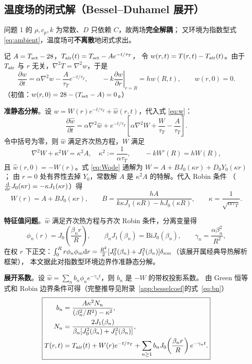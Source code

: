 \documentclass[withoutpreface,bwprint]{cumcmthesis}
\begin{document}
\subsection{温度场的闭式解（Bessel--Duhamel 展开）}
\label{sec:bessel}

问题 1 的 $\rho,c_p,k$ 为常数、$D$ 只依赖 $C$，故两场\textbf{完全解耦}；
又环境为指数型式 \eqref{eq:ambient}，温度场可\textbf{不离散}地闭式求出。

记 $A=T_{\rm set}-28$，$T_{\rm air}(t)=T_{\rm set}-Ae^{-t/\tau_T}$，
令 $w(r,t)=T(r,t)-T_{\rm air}(t)$。由于 $T_{\rm air}$ 与 $r$ 无关，$\nabla^2T=\nabla^2w$，于是
\begin{equation}
\frac{\partial w}{\partial t}=\alpha\nabla^2w-\frac{A}{\tau_T}e^{-t/\tau_T},
\qquad
-k\left.\frac{\partial w}{\partial r}\right|_{r=R}=hw(R,t),
\qquad
w(r,0)=0 .
\label{eq:w}
\end{equation}
（初值：$w(r,0)=28-(T_{\rm set}-A)=0$。）

\textbf{准静态分解}。设 $w=W(r)e^{-t/\tau_T}+\hat w(r,t)$，代入式 \eqref{eq:w}：
\[
\frac{\partial\hat w}{\partial t}=\alpha\nabla^2\hat w
+e^{-t/\tau_T}\left[\alpha\nabla^2W+\frac{W}{\tau_T}-\frac{A}{\tau_T}\right].
\]
令中括号为零，则 $\hat w$ 满足齐次热方程，$W$ 满足
\begin{equation}
\nabla^2W+\kappa^2W=\kappa^2A,\quad \kappa^2:=\frac{1}{\alpha\tau_T},
\qquad
-kW'(R)=hW(R),
\label{eq:Wode}
\end{equation}
且 $\hat w(r,0)=-W(r)$。式 \eqref{eq:Wode} 通解为 $W=A+BJ_0(\kappa r)+D_0Y_0(\kappa r)$；
由 $r=0$ 处有界性去掉 $Y_0$，常数解 $A$ 是 $\kappa^2A$ 的特解。代入 Robin 条件
（$\frac{\rm d}{{\rm d}r}J_0(\kappa r)=-\kappa J_1(\kappa r)$）得
\begin{equation}
\boxed{\;W(r)=A+BJ_0(\kappa r),\qquad
B=\frac{hA}{k\kappa J_1(\kappa R)-hJ_0(\kappa R)},\qquad
\kappa=\frac{1}{\sqrt{\alpha\tau_T}}.\;}
\label{eq:W}
\end{equation}

\textbf{特征值问题}。$\hat w$ 满足齐次热方程与齐次 Robin 条件，分离变量得
\begin{equation}
\phi_n(r)=J_0\!\left(\frac{\beta_nr}{R}\right),
\qquad
\beta_nJ_1(\beta_n)=\mathrm{Bi}J_0(\beta_n),
\qquad
\gamma_n=\frac{\alpha\beta_n^2}{R^2},
\label{eq:eig}
\end{equation}
在权 $r$ 下正交：$\int_0^Rr\phi_n\phi_m{\rm d}r=\frac{R^2}{2}
[J_0^2(\beta_n)+J_1^2(\beta_n)]\delta_{nm}$（该展开属经典导热解析框架\cite{carslaw}），
本文据此对指数型环境边界作准静态分解。

\textbf{展开系数}。设 $\hat w=\sum_nb_n\phi_ne^{-\gamma_nt}$，则 $b_n$ 是 $-W$ 的带权投影系数。
由 Green 恒等式和 Robin 边界条件可得（完整推导见附录~\ref{app:besselcoef}的式~\eqref{eq:bn}）
\begin{equation}
\boxed{\begin{aligned}
b_n&=\frac{A\kappa^2N_n}{(\beta_n^2/R^2)-\kappa^2},\\
N_n&=\frac{2J_1(\beta_n)}{\beta_n[J_0^2(\beta_n)+J_1^2(\beta_n)]},\\
T(r,t)&=T_{\rm air}(t)+W(r)e^{-t/\tau_T}
+\sum_{n\ge1}b_nJ_0\!\left(\frac{\beta_nr}{R}\right)e^{-\gamma_nt}.
\end{aligned}}
\label{eq:Tsol}
\end{equation}
\end{document}
